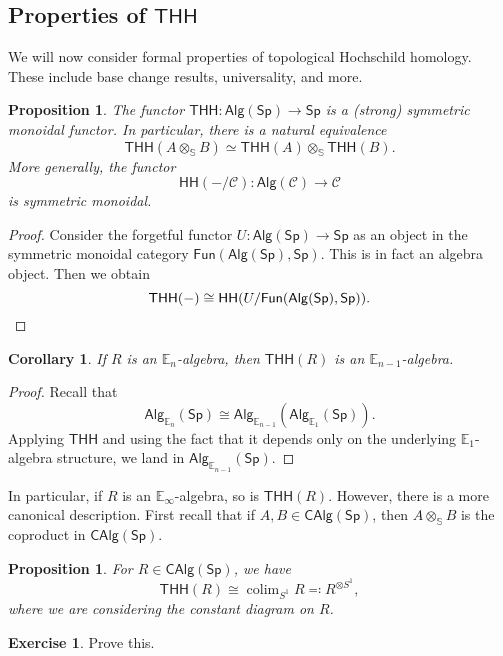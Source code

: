 \documentclass[10pt, oneside]{memoir}
\newtheorem{cor}[thm]{Corollary}
\newtheorem{prop}[thm]{Proposition}
\theoremstyle{definition}
\newtheorem{exer}[thm]{Exercise}
\theoremstyle{remark}
\theoremstyle{plain}
\theoremstyle{definition}
\theoremstyle{remark}
\newcommand{\E}{\mathbb{E}}
\newcommand{\bS}{\mathbb{S}}
\newcommand{\mc}[1]{\mathcal{#1}}
\newcommand{\ms}[1]{\mathsf{#1}}
\newcommand{\1}{\mathbf{1}}
\newcommand{\2}{\mathbf{2}}
\newcommand{\3}{\mathbf{3}}
\newcommand{\THH}{\ms{THH}}
\newcommand{\HH}{\ms{HH}}
\DeclareMathOperator*{\colim}{colim}
\begin{document}
\subsection{Properties of $\THH$}%

We will now consider formal properties of topological Hochschild homology. These include base change results, universality, and more.

\begin{prop}
    The functor $\THH \colon \ms{Alg}(\ms{Sp}) \to \ms{Sp}$ is a (strong) symmetric monoidal functor. In particular, there is a natural equivalence
    \[ \THH(A \otimes_{\bS} B) \simeq \THH(A) \otimes_{\bS} \THH(B). \]
    More generally, the functor
    \[ \HH(-/\mc{C}) \colon \ms{Alg}(\mc{C}) \to \mc{C} \]
    is symmetric monoidal.
\end{prop}

\begin{proof}
    Consider the forgetful functor $U \colon \ms{Alg}(\ms{Sp}) \to \ms{Sp}$ as an object in the symmetric monoidal category $\ms{Fun}(\ms{Alg}(\ms{Sp}), \ms{Sp})$. This is in fact an algebra object. Then we obtain
    \[ \THH(-) \cong \HH(U/\ms{Fun}(\ms{Alg}(\ms{Sp}), \ms{Sp})). \qedhere \]
\end{proof}

\begin{cor}
    If $R$ is an $\E_n$-algebra, then $\THH(R)$ is an $\E_{n-1}$-algebra.
\end{cor}

\begin{proof}
    Recall that
    \[ \ms{Alg}_{\E_n}(\ms{Sp}) \cong \ms{Alg}_{\E_{n-1}}(\ms{Alg}_{\E_1}(\ms{Sp})). \]
    Applying $\THH$ and using the fact that it depends only on the underlying $\E_1$-algebra structure, we land in $\ms{Alg}_{\E_{n-1}}(\ms{Sp})$.
\end{proof}

In particular, if $R$ is an $\E_{\infty}$-algebra, so is $\THH(R)$. However, there is a more canonical description. First recall that if $A, B \in \ms{CAlg}(\ms{Sp})$, then $A \otimes_{\bS} B$ is the coproduct in $\ms{CAlg}(\ms{Sp})$.

\begin{prop}
    For $R \in \ms{CAlg}(\ms{Sp})$, we have
    \[ \THH(R) \cong \colim_{S^1} R \eqqcolon R^{\otimes S^1}, \]
    where we are considering the constant diagram on $R$.
\end{prop}

\begin{exer}
    Prove this.
\end{exer}
\end{document}
